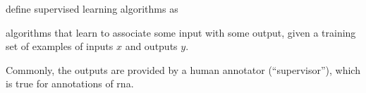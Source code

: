 


\textcite{goodfellow2016deep} define supervised learning
algorithms as

\begin{italicquotes}
    algorithms that learn to associate some input with some
    output, given a training set of examples of inputs $x$
    and outputs $y$.
\end{italicquotes}

Commonly, the outputs are provided by a human annotator
(``supervisor''), which is true for annotations of
\gls{rna}.

